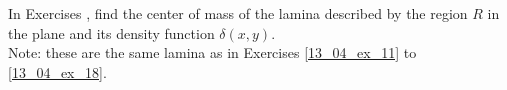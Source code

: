 {\noindent In Exercises}
{, find the center of mass of the lamina described by the region $R$ in the plane and its density function $\delta(x,y)$.\\
Note: these are the same lamina as in Exercises \ref{13_04_ex_11} to \ref{13_04_ex_18}.
}
